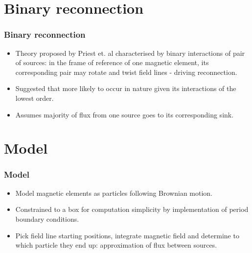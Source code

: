\documentclass{beamer}
\begin{document}
\section{Binary reconnection}
\begin{frame}
    \frametitle{Binary reconnection}
    \small
    \begin{itemize}
        \item Theory proposed by Priest et. al characterised by binary interactions of pair of sources: in the frame of reference of one magnetic element, its corresponding pair may rotate and twist field lines - driving reconnection.
        \item Suggested that more likely to occur in nature given its interactions of the lowest order.
        \item Assumes majority of flux from one source goes to its corresponding sink.
    \end{itemize}
\end{frame}


\section{Model}
\begin{frame}
    \frametitle{Model}
    \small
    \begin{itemize}
        \item Model magnetic elements as particles following Brownian motion.
        \item Constrained to a box for computation simplicity by implementation of period boundary conditions.
        \item Pick field line starting positions, integrate magnetic field and determine to which particle they end up: approximation of flux between sources.
    \end{itemize}
\end{frame}
\end{document}
